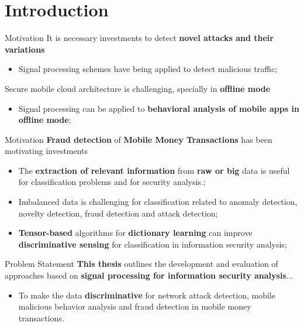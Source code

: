 \documentclass[newPxFont, numfooter, sectionpages]{beamer}
\begin{document}
\section{Introduction}
\begin{frame}[c]{Motivation}
	It is necessary investments to detect \textbf{novel attacks and their variations}
	\begin{itemize}
		\item Signal processing schemes have being applied to detect malicious traffic;		
	\end{itemize}
	Secure mobile cloud architecture is challenging, specially in \textbf{offline mode}
	\begin{itemize}
		\item Signal processing can be applied to \textbf{behavioral analysis of mobile apps in offline mode};		
	\end{itemize}
\end{frame}
\begin{frame}[c]{Motivation}
	\textbf{Fraud detection} of \textbf{Mobile Money Transactions} has been motivating investments
	\begin{itemize}
		\item The \textbf{extraction of relevant information} from \textbf{raw or big} data is useful for classification problems and for security analysis.;
		\item Imbalanced data is challenging for classification related to anomaly detection, novelty detection, fraud detection and attack detection;
		\item \textbf{Tensor-based} algorithms for \textbf{dictionary learning} can improve \textbf{discriminative sensing} for classification in information security analysis;
	\end{itemize}
\end{frame}
\begin{frame}[c]{Problem Statement}
	\textbf{This thesis} outlines the development and evaluation of approaches based on \textbf{signal processing for information security analysis}...
	\begin{itemize}
		\item To make the data \textbf{discriminative} for network attack detection, mobile malicious behavior analysis and fraud detection in mobile money transactions.
	\end{itemize}
\end{frame}
\end{document}
